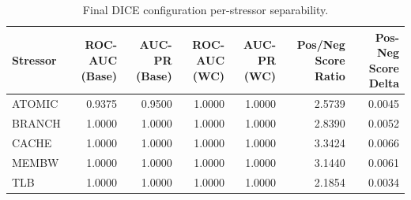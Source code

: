 \begin{table}[t]
\centering
\caption{Final DICE configuration per-stressor separability.}
\label{tab:dice_full_stressor}
\footnotesize
\begin{tabular}{lrrrrrr}
\toprule
Stressor & ROC-AUC (Base) & AUC-PR (Base) & ROC-AUC (WC) & AUC-PR (WC) & Pos/Neg Score Ratio & Pos-Neg Score Delta \\
\midrule
ATOMIC & 0.9375 & 0.9500 & 1.0000 & 1.0000 & 2.5739 & 0.0045 \\
BRANCH & 1.0000 & 1.0000 & 1.0000 & 1.0000 & 2.8390 & 0.0052 \\
CACHE & 1.0000 & 1.0000 & 1.0000 & 1.0000 & 3.3424 & 0.0066 \\
MEMBW & 1.0000 & 1.0000 & 1.0000 & 1.0000 & 3.1440 & 0.0061 \\
TLB & 1.0000 & 1.0000 & 1.0000 & 1.0000 & 2.1854 & 0.0034 \\
\bottomrule
\end{tabular}

\end{table}
